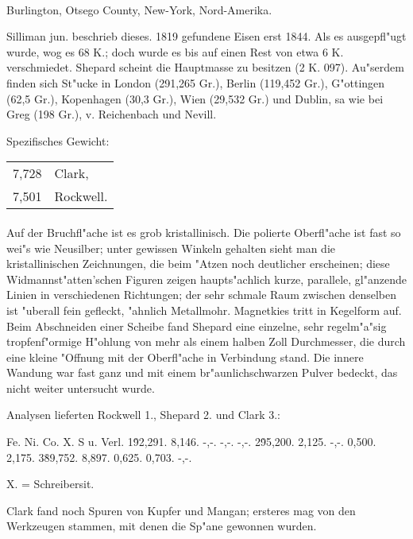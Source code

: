 \documentclass[a4paper, 11pt, oneside]{article}
\begin{document}
\paragraph{}
Burlington, Otsego County, New-York, Nord-Amerika.

Silliman jun. beschrieb dieses. 1819 gefundene Eisen erst 1844. Als es ausgepfl"ugt wurde, wog es 68 K.; doch wurde es bis auf einen Rest von etwa 6 K. verschmiedet. Shepard scheint die Hauptmasse zu besitzen (2 K. 097). Au"serdem finden sich St"ucke in London (291,265 Gr.), Berlin (119,452 Gr.), G"ottingen (62,5 Gr.), Kopenhagen (30,3 Gr.), Wien (29,532 Gr.) und Dublin, sa wie bei Greg (198 Gr.), v. Reichenbach und Nevill.

Spezifisches Gewicht:  
\begin{table}[!ht]
    \centering
    \begin{tabular}{l l}
        7,728 & Clark,\\
        7,501 & Rockwell.
    \end{tabular}
\end{table}
\paragraph{}
Auf der Bruchfl"ache ist es grob kristallinisch. Die polierte Oberfl"ache ist fast so wei"s wie Neusilber; unter gewissen Winkeln gehalten sieht man die kristallinischen Zeichnungen, die beim "Atzen noch deutlicher erscheinen; diese Widmannst"atten'schen Figuren zeigen haupts"achlich kurze, parallele, gl"anzende Linien in verschiedenen Richtungen; der sehr schmale Raum zwischen denselben ist "uberall fein gefleckt, "ahnlich Metallmohr. Magnetkies tritt in Kegelform auf. Beim Abschneiden einer Scheibe fand Shepard eine einzelne, sehr regelm"a"sig tropfenf"ormige H"ohlung von mehr als einem halben Zoll Durchmesser, die durch eine kleine "Offnung mit der Oberfl"ache in Verbindung stand. Die innere Wandung war fast ganz und mit einem br"aunlichschwarzen Pulver bedeckt, das nicht weiter untersucht wurde.

Analysen lieferten Rockwell 1., Shepard 2. und Clark 3.:

Fe. Ni. Co. X. S u. Verl.  
1\. 92,291. 8,146. -,-. -,-. -,-.  
2\. 95,200. 2,125. -,-. 0,500. 2,175.  
3\. 89,752. 8,897. 0,625. 0,703. -,-.

X. = Schreibersit.

Clark fand noch Spuren von Kupfer und Mangan; ersteres mag von den Werkzeugen stammen, mit denen die Sp"ane gewonnen wurden.
\end{document}
